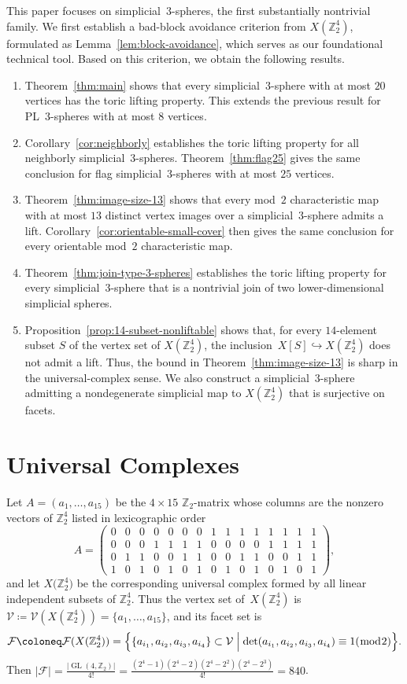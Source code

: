 \documentclass{amsart}
\newcommand{\Z}{\mathbb{Z}}
\newcommand{\cF}{\mathcal{F}}
\newcommand{\cV}{\mathcal{V}}
\DeclareMathOperator{\GL}{GL}
\theoremstyle{definition}
\theoremstyle{remark}
\begin{document}
This paper focuses on simplicial~$3$-spheres, the first substantially nontrivial family.
We first establish a bad-block avoidance criterion from $X(\Z_2^4)$, formulated as Lemma~\ref{lem:block-avoidance}, which serves as our foundational technical tool. 
Based on this criterion, we obtain the following results.
\begin{enumerate}
    \item Theorem~\ref{thm:main} shows that every simplicial~$3$-sphere with at most $20$ vertices has the toric lifting property. 
        This extends the previous result for PL~$3$-spheres with at most $8$ vertices.
    \item Corollary~\ref{cor:neighborly} establishes the toric lifting property for all neighborly simplicial~$3$-spheres. 
        Theorem~\ref{thm:flag25} gives the same conclusion for flag simplicial~$3$-spheres with at most $25$ vertices.
    \item Theorem~\ref{thm:image-size-13} shows that every mod~$2$ characteristic map with at most $13$ distinct vertex images over a simplicial~$3$-sphere admits a lift. 
        Corollary~\ref{cor:orientable-small-cover} then gives the same conclusion for every orientable mod~$2$ characteristic map.
    \item Theorem~\ref{thm:join-type-3-spheres} establishes the toric lifting property for every simplicial~$3$-sphere that is a nontrivial join of two lower-dimensional simplicial spheres.
    \item Proposition~\ref{prop:14-subset-nonliftable} shows that, for every $14$-element subset $S$ of the vertex set of $X(\Z_2^4)$, the inclusion~$X[S]\hookrightarrow X(\Z_2^4)$ does not admit a lift. 
        Thus, the bound in Theorem~\ref{thm:image-size-13} is sharp in the universal-complex sense. 
        We also construct a simplicial~$3$-sphere admitting a nondegenerate simplicial map to $X(\Z_2^4)$ that is surjective on facets.
\end{enumerate}


\section{Universal Complexes} \label{universal cpx}
Let $A=(a_1,\dots,a_{15})$ be the $4\times 15$ $\Z_2$-matrix whose columns are the nonzero vectors of $\Z_2^4$ listed in lexicographic order
$$
    A= \left(
    \begin{array}{ccccccccccccccc}
        0&0&0&0&0&0&0&1&1&1&1&1&1&1&1\\
        0&0&0&1&1&1&1&0&0&0&0&1&1&1&1\\
        0&1&1&0&0&1&1&0&0&1&1&0&0&1&1\\
        1&0&1&0&1&0&1&0&1&0&1&0&1&0&1
    \end{array} \right),
$$
and let $X\bigl(\Z_2^4\bigr)$ be the corresponding universal complex formed by all linear independent subsets of $\Z_2^4$.
Thus the vertex set of~$X(\Z_2^4)$ is $\cV\coloneq\cV(X(\Z_2^4)) = \{a_1,\dots,a_{15}\}$, and its facet set is
$$
    \cF\coloneq\cF(X(\Z_2^4)) =\Bigl\{ \{a_{i_1},a_{i_2},a_{i_3},a_{i_4}\}\subset \cV \Bigm| \det(a_{i_1},a_{i_2},a_{i_3},a_{i_4})\equiv 1 (\bmod 2) \Bigr\}.
$$
Then $|\cF|=\frac{|\GL(4,\Z_2)|}{4!}=\frac{(2^4-1)(2^4-2)(2^4-2^2)(2^4-2^3)}{4!}=840$.
\end{document}
